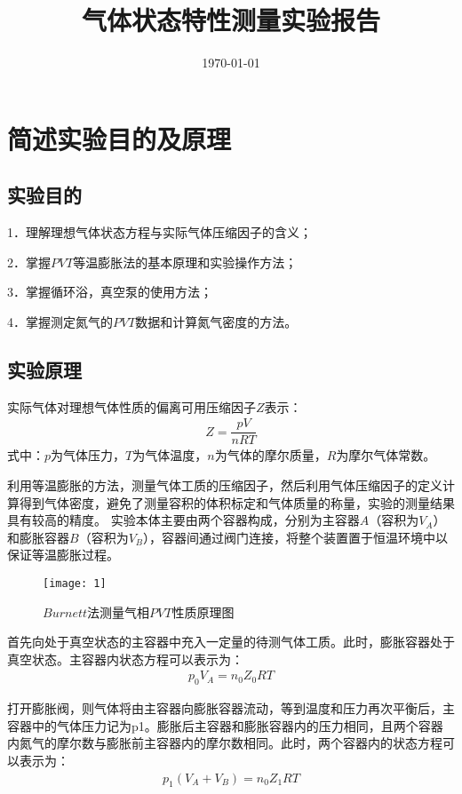 \documentclass[UTF8,a4paper,10pt]{ctexart}
\title{\textbf{气体状态特性测量实验报告}}
\author{}
\date{\today}
\begin{document}
	\maketitle
	\section{简述实验目的及原理}
	\subsection{实验目的}
	1．理解理想气体状态方程与实际气体压缩因子的含义；
	
	
	2．掌握$PVT$等温膨胀法的基本原理和实验操作方法；
	
	
	3．掌握循环浴，真空泵的使用方法；
	
	
	4．掌握测定氮气的$PVT$数据和计算氮气密度的方法。
	
	
	\subsection{实验原理}
	实际气体对理想气体性质的偏离可用压缩因子$Z$表示：
	\begin{align}
	Z=\dfrac{pV}{nRT}
	\end{align}
	式中：$p$为气体压力，$T$为气体温度，$n$为气体的摩尔质量，$R$为摩尔气体常数。
	
	利用等温膨胀的方法，测量气体工质的压缩因子，然后利用气体压缩因子的定义计算得到气体密度，避免了测量容积的体积标定和气体质量的称量，实验的测量结果具有较高的精度。
	实验本体主要由两个容器构成，分别为主容器$A$（容积为$V_{A}$）和膨胀容器$B$（容积为$V_{B}$），容器间通过阀门连接，将整个装置置于恒温环境中以保证等温膨胀过程。
    \begin{figure}[h]
	\centering
	\texttt{[image: 1]}
	\caption{ $Burnett$法测量气相$PVT$性质原理图}
    \end{figure}

    首先向处于真空状态的主容器中充入一定量的待测气体工质。此时，膨胀容器处于真空状态。主容器内状态方程可以表示为：
    \begin{align}
    p_{0}V_{A}=n_{0}Z_{0}RT
    \end{align}
    
    打开膨胀阀，则气体将由主容器向膨胀容器流动，等到温度和压力再次平衡后，主容器中的气体压力记为p1。膨胀后主容器和膨胀容器内的压力相同，且两个容器内氮气的摩尔数与膨胀前主容器内的摩尔数相同。此时，两个容器内的状态方程可以表示为：
    \begin{align}
    p_{1}(V_{A}+V_{B})=n_{0}Z_{1}RT
    \end{align}
    
\end{document}
